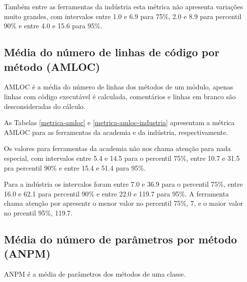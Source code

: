 Também entre as ferramentas da indústria esta métrica não apresenta variações
muito grandes, com intervalos entre 1.0 e 6.9 para 75\%, 2.0 e 8.9 para
percentil 90\% e entre 4.0 e 15.6 para 95\%.

\subsection{Média do número de linhas de código por método (AMLOC)}

AMLOC é a média do número de linhas dos métodos de um módulo, apenas linhas
com código executável é calculada, comentários e linhas em branco são
desconsideradas do cálculo.

As Tabelas \ref{metrica-amloc} e \ref{metrica-amloc-industria} apresentam a
métrica AMLOC para as ferramentas da academia e da indústria, respectivamente.


Os valores para ferramentas da academia não nos chama atenção para nada
especial, com intervalos entre 5.4 e 14.5 para o percentil 75\%, entre 10.7 e
31.5 pra percentil 90\% e entre 15.4 e 51.4 para 95\%.


Para a indústria os intervalos foram entre 7.0 e 36.9 para o percentil 75\%,
entre 16.0 e 62.1 para percentil 90\% e entre 22.0 e 119.7 para 95\%. A
ferramenta chama atenção por apresentr o menor valor no percentil 75\%, 7, e o
maior valor no prcentil 95\%, 119.7.

\subsection{Média do número de parâmetros por método (ANPM)}

ANPM é a média de parâmetros dos métodos de uma classe.

